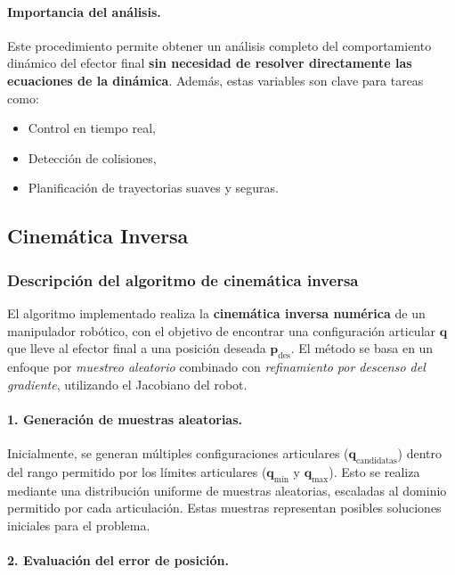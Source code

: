 \vspace{0.5em}
\paragraph{Importancia del análisis.}

Este procedimiento permite obtener un análisis completo del comportamiento dinámico del efector final \textbf{sin necesidad de resolver directamente las ecuaciones de la dinámica}. Además, estas variables son clave para tareas como:

\begin{itemize}
	\item Control en tiempo real,
	\item Detección de colisiones,
	\item Planificación de trayectorias suaves y seguras.
\end{itemize}


\subsection{Cinemática Inversa}
\subsubsection{Descripción del algoritmo de cinemática inversa}

El algoritmo implementado realiza la \textbf{cinemática inversa numérica} de un manipulador robótico, con el objetivo de encontrar una configuración articular $\mathbf{q}$ que lleve al efector final a una posición deseada $\mathbf{p}_{\text{des}}$. El método se basa en un enfoque por \textit{muestreo aleatorio} combinado con \textit{refinamiento por descenso del gradiente}, utilizando el Jacobiano del robot.

\paragraph{1. Generación de muestras aleatorias.}

Inicialmente, se generan múltiples configuraciones articulares ($\mathbf{q}_{\text{candidatas}}$) dentro del rango permitido por los límites articulares ($\mathbf{q}_{\min}$ y $\mathbf{q}_{\max}$). Esto se realiza mediante una distribución uniforme de muestras aleatorias, escaladas al dominio permitido por cada articulación. Estas muestras representan posibles soluciones iniciales para el problema.

\paragraph{2. Evaluación del error de posición.}

